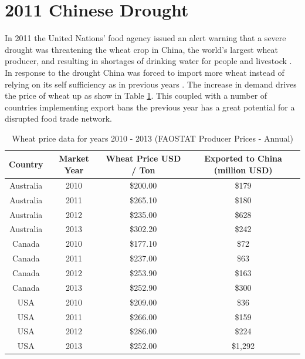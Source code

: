 \section{2011 Chinese Drought}
In 2011 the United Nations’ food agency issued an alert warning that a severe drought was threatening the wheat crop in China, the world's largest wheat producer, and resulting in shortages of drinking water for people and livestock \citep{bradsher2011food}. In response to the drought China was forced to import more wheat instead of relying on its self sufficiency as in previous years \citep{sternberg2012chinese}. The increase in demand drives the price of wheat up as show in Table \ref{wheatTable}. This coupled with a number of countries implementing export bans the previous year \citep{fellmann2014harvest} has a great potential for a disrupted food trade network.\par
\begin{center}
	\begin{table}[htb]
		\centering
		\begin{tabular}{| c | c | c | c |}
			\hline
			Country & Market Year & Wheat Price USD / Ton & Exported to China (million USD)\\
			\hline \hline
			Australia & 2010 & \$200.00 & \$179\\ \hline
			Australia & 2011 & \$265.10 & \$180\\ \hline
			Australia & 2012 & \$235.00 & \$628\\ \hline
			Australia & 2013 & \$302.20 & \$242\\ \hline \hline
			Canada & 2010 & \$177.10 & \$72\\ \hline
			Canada & 2011 & \$237.00 & \$63\\ \hline
			Canada & 2012 & \$253.90 & \$163\\ \hline
			Canada & 2013 & \$252.90 & \$300\\ \hline \hline
			USA & 2010 & \$209.00 & \$36\\ \hline
			USA & 2011 & \$266.00 & \$159\\ \hline
			USA & 2012 & \$286.00 & \$224\\ \hline
			USA & 2013 & \$252.00 & \$1,292\\ \hline
		\end{tabular}
		\caption[WHEAT PRICE DATA FOR YEARS 2010 - 2013]{Wheat price data for years 2010 - 2013 (FAOSTAT Producer Prices - Annual) \citep{faostat}}
		\label{wheatTable}
	\end{table}
\end{center}

